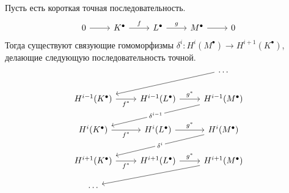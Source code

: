 \documentclass[../main.tex]{subfiles}
\begin{document}
\begin{to_suj}\label{B:zigzag_lemma}
Пусть есть короткая точная последовательность.
\begin{equation*}
    \begin{tikzcd}
	0 & {K^\bullet} & {L^\bullet} & {M^\bullet} & 0
	\arrow[from=1-1, to=1-2]
	\arrow["f", from=1-2, to=1-3]
	\arrow["g", from=1-3, to=1-4]
	\arrow[from=1-4, to=1-5]
\end{tikzcd}
\end{equation*}
Тогда существуют связующие гомоморфизмы $\delta^i: H^i(M^\bullet) \to H^{i+1}(K^\bullet)$, делающие следующую последовательность точной.
\begin{equation*}
    \begin{tikzcd}
	&& \ldots \\
	{H^{i-1}(K^\bullet)} & {H^{i-1}(L^\bullet)} & {H^{i-1}(M^\bullet)} \\
	{H^i(K^\bullet)} & {H^i(L^\bullet)} & {H^i(M^\bullet)} \\
	{H^{i+1}(K^\bullet)} & {H^{i+1}(L^\bullet)} & {H^{i+1}(M^\bullet)} \\
	\ldots
	\arrow[from=1-3, to=2-1]
	\arrow["{f^*}"', from=2-1, to=2-2]
	\arrow["{g^*}", from=2-2, to=2-3]
	\arrow["{\delta^{i-1}}"{description}, from=2-3, to=3-1]
	\arrow["{f^*}"', from=3-1, to=3-2]
	\arrow["{g^*}", from=3-2, to=3-3]
	\arrow["{\delta^i}"{description}, from=3-3, to=4-1]
	\arrow["{f^*}"', from=4-1, to=4-2]
	\arrow["{g^*}", from=4-2, to=4-3]
	\arrow[from=4-3, to=5-1]
\end{tikzcd}
\end{equation*}
\end{to_suj}
\end{document}
